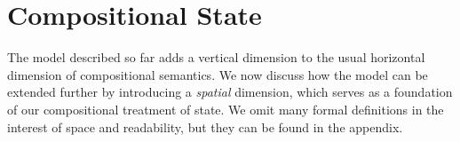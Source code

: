\documentclass[acmsmall,screen,review,anonymous,nonacm]{acmart}
\newcommand{\kw}[1]{\ensuremath{ \mathsf{#1} }}
\newcommand{\que}{\circ}
\newcommand{\ans}{\bullet}
\begin{document}
%
%
%
%
%


\section{Compositional State} \label{sec:scomp} %


The model described so far adds a vertical dimension
to the usual horizontal dimension of compositional semantics.
We now discuss how the model can be extended further
by introducing a \emph{spatial} dimension,
which serves as a foundation of our compositional treatment of state.
We omit many formal definitions
in the interest of space and readability,
but they can be found in the appendix.
\end{document}

